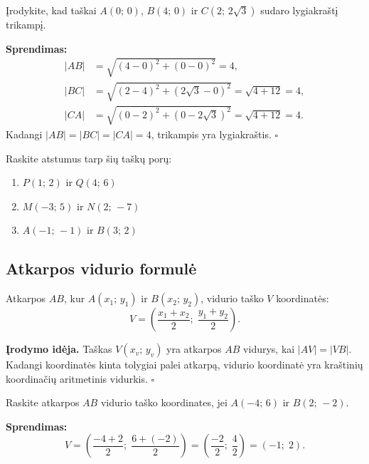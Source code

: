 \begin{example}
Įrodykite, kad taškai $A(0;\,0)$, $B(4;\,0)$ ir $C(2;\,2\sqrt{3})$ sudaro lygiakraštį trikampį.

\textbf{Sprendimas:}
\begin{align*}
    |AB| &= \sqrt{(4-0)^2 + (0-0)^2} = 4, \\
    |BC| &= \sqrt{(2-4)^2 + (2\sqrt{3}-0)^2} = \sqrt{4 + 12} = 4, \\
    |CA| &= \sqrt{(0-2)^2 + (0-2\sqrt{3})^2} = \sqrt{4 + 12} = 4.
\end{align*}
Kadangi $|AB| = |BC| = |CA| = 4$, trikampis yra lygiakraštis. $\square$
\end{example}

\begin{exercise}
Raskite atstumus tarp šių taškų porų:
\begin{enumerate}[label=\alph*)]
    \item $P(1;\,2)$ ir $Q(4;\,6)$
    \item $M(-3;\,5)$ ir $N(2;\,-7)$
    \item $A(-1;\,-1)$ ir $B(3;\,2)$
\end{enumerate}
\end{exercise}

\subsection{Atkarpos vidurio formulė}

\begin{definition}
Atkarpos $AB$, kur $A(x_1;\, y_1)$ ir $B(x_2;\, y_2)$, vidurio taško $V$ koordinatės:
\[
    V = \left(\frac{x_1 + x_2}{2};\; \frac{y_1 + y_2}{2}\right).
\]
\end{definition}

\textbf{Įrodymo idėja.} Taškas $V(x_v;\, y_v)$ yra atkarpos $AB$ vidurys, kai $|AV| = |VB|$. Kadangi koordinatės kinta tolygiai palei atkarpą, vidurio koordinatė yra kraštinių koordinačių aritmetinis vidurkis. $\square$

\begin{example}
Raskite atkarpos $AB$ vidurio taško koordinates, jei $A(-4;\, 6)$ ir $B(2;\, -2)$.

\textbf{Sprendimas:}
\[
    V = \left(\frac{-4+2}{2};\; \frac{6+(-2)}{2}\right) = \left(\frac{-2}{2};\; \frac{4}{2}\right) = (-1;\; 2).
\]
\end{example}

